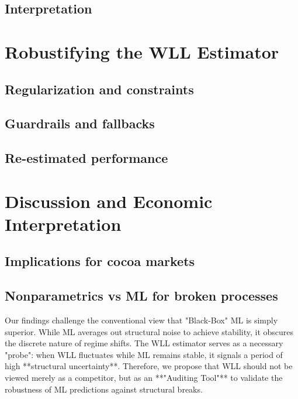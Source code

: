 \documentclass[11pt]{article}
\newcommand{\1}{\mathbf{1}}
\begin{document}
\subsection{Interpretation}

\section{Robustifying the WLL Estimator}
\label{sec:robust-wll}

\subsection{Regularization and constraints}

\subsection{Guardrails and fallbacks}

\subsection{Re-estimated performance}

\section{Discussion and Economic Interpretation}
\label{sec:discussion}

\subsection{Implications for cocoa markets}

\subsection{Nonparametrics vs ML for broken processes}
Our findings challenge the conventional view that "Black-Box" ML is simply superior. While ML averages out structural noise to achieve stability, it obscures the discrete nature of regime shifts.
The WLL estimator serves as a necessary "probe": when WLL fluctuates while ML remains stable, it signals a period of high **structural uncertainty**.
Therefore, we propose that WLL should not be viewed merely as a competitor, but as an **"Auditing Tool"** to validate the robustness of ML predictions against structural breaks.
\end{document}
